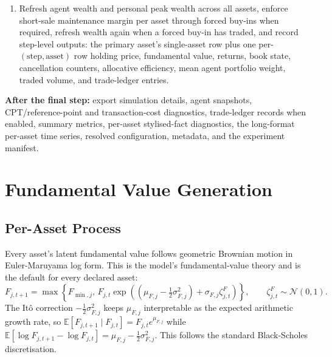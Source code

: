 \documentclass[12pt, a4paper]{article}
\begin{document}
\begin{framed}
\begin{enumerate}
                    forward the previous observed market price.
                    \item Refresh agent wealth and personal peak wealth across all assets,
                    enforce short-sale maintenance margin per asset through forced buy-ins when
                    required, refresh wealth again when a forced buy-in has traded, and record
                    step-level outputs: the primary asset's single-asset row plus one
                    per-\((\text{step},\text{asset})\) row holding price, fundamental value,
                    returns, book state, cancellation counters, allocative efficiency, mean
                    agent portfolio weight, traded volume, and trade-ledger entries.
                \end{enumerate}

                \textbf{After the final step:} export simulation details, agent snapshots,
                CPT/reference-point and transaction-cost diagnostics, trade-ledger records
                when enabled, summary metrics, per-asset stylised-fact diagnostics, the
                long-format per-asset time series, resolved configuration, metadata, and the
                experiment manifest.
    \end{framed}

    \section{Fundamental Value Generation}\label{sec:fundamental_value}

    \subsection{Per-Asset Process}

    Every asset's latent fundamental value follows geometric Brownian motion in
    Euler-Maruyama log form. This is the model's fundamental-value theory and is
    the default for every declared asset:
    \[
        F_{j,t+1}
        =
        \max\!\left\{
            F_{\min,j},\,
            F_{j,t}\exp\!\left(
                \left(\mu_{F,j}-\tfrac{1}{2}\sigma_{F,j}^{2}\right)
                +\sigma_{F,j}\zeta_{j,t}^{F}
            \right)
        \right\},
        \qquad
        \zeta_{j,t}^{F}\sim\mathcal{N}(0,1).
    \]
    The It\^o correction \(-\tfrac12\sigma_{F,j}^2\) keeps \(\mu_{F,j}\)
    interpretable as the expected arithmetic growth rate, so
    \(\mathbb{E}[F_{j,t+1}\mid F_{j,t}]=F_{j,t}e^{\mu_{F,j}}\) while
    \(\mathbb{E}[\log F_{j,t+1}-\log F_{j,t}]=\mu_{F,j}-\tfrac12\sigma_{F,j}^2\).
    This follows the standard Black-Scholes discretisation.
\end{document}
